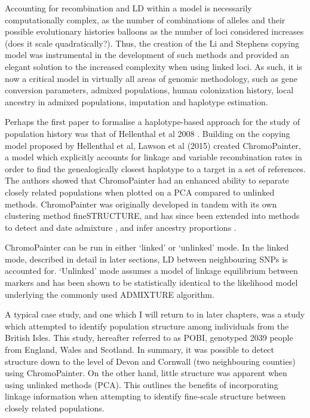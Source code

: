 Accounting for recombination and LD within a model is necessarily computationally complex, as the number of combinations of alleles and their possible evolutionary histories balloons as the number of loci considered increases (does it scale quadratically?). Thus, the creation of the Li and Stephens copying model \cite{Li2003} was instrumental in the development of such methods \cite{song2016li} and provided an elegant solution to the increased complexity when using linked loci. As such, it is now a critical model in virtually all areas of genomic methodology, such as gene conversion parameters, admixed populations, human colonization history, local ancestry in admixed populations, imputation and haplotype estimation. 

Perhaps the first paper to formalise a haplotype-based approach for the study of population history was that of Hellenthal et al 2008 \cite{hellenthal2008inferring}. Building on the copying model proposed by Hellenthal et al, Lawson et al (2015) \cite{Lawson2012} created ChromoPainter, a model which explicitly accounts for linkage and variable recombination rates in order to find the genealogically closest haplotype to a target in a set of references. The authors showed that ChromoPainter had an enhanced ability to separate closely related populations when plotted on a PCA compared to unlinked methods. ChromoPainter was originally developed in tandem with its own clustering method fineSTRUCTURE, and has since been extended into methods to detect and date admixture \cite{Hellenthal2014}, and infer ancestry proportions \cite{Chacon-Duque2018}. 

ChromoPainter can be run in either `linked' or `unlinked' mode. In the linked mode, described in detail in later sections, LD between neighbouring SNPs is accounted for. `Unlinked' mode assumes a model of linkage equilibrium between markers and has been shown to be statistically identical to the likelihood model underlying the commonly used ADMIXTURE algorithm. 

A typical case study, and one which I will return to in later chapters, was a study which attempted to identify population structure among individuals from the British Isles. This study, hereafter referred to as POBI, genotyped 2039 people from England, Wales and Scotland. In summary, it was possible to detect structure down to the level of Devon and Cornwall (two neighbouring counties) using ChromoPainter. On the other hand, little structure was apparent when using unlinked methods (PCA). This outlines the benefits of incorporating linkage information when attempting to identify fine-scale structure between closely related populations.


